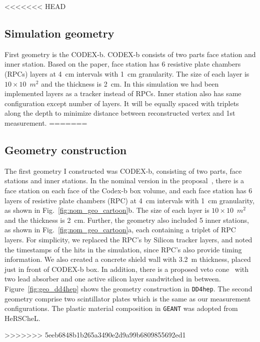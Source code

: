 <<<<<<< HEAD
\subsection{Simulation geometry}
First geometry is the CODEX-b.
CODEX-b consists of two parts face station and inner station.
Based on the paper, face station has 6 resistive plate chambers (RPCs) layers at 4~cm intervals with 1~cm granularity.
The size of each layer is $10 \times 10$~$m^{2}$ and the thickness is 2~cm. 
In this simulation we had been implemented layers as a tracker instead of RPCs.
Inner station also has same configuration except number of layers.
It will be equally spaced with triplets along the depth to minimize distance between reconstructed vertex and 1st measurement. 
=======





\subsection{Geometry construction}
The first geometry I constructed was CODEX-b, consisting of two parts, face stations and inner stations. In the nominal version in the proposal~\cite{Gligorov:2017nwh}, there is a face station on each face of the Codex-b box volume, and each face station has 6 layers of resistive plate chambers (RPC) at 4~cm intervals with 1~cm granularity, as shown in Fig.~\ref{fig:nom_geo_cartoon}b. The size of each layer is $10 \times 10$~$m^{2}$ and the thickness is 2~cm. Further, the geometry also included 5 inner stations, as shown in Fig.~\ref{fig:nom_geo_cartoon}a, each containing a triplet of RPC layers. For simplicity, we replaced the RPC's by Silicon tracker layers, and noted the timestamps of the hits in the simulation, since RPC's also provide timing information. We also created a concrete shield wall with 3.2~m thickness, placed just in front of CODEX-b box. In addition, there is a proposed veto cone~\cite{Gligorov:2017nwh} with two lead absorber and one active silicon layer sandwitched in between. Figure~\ref{fig:geo_dd4hep} shows the geometry construction in {\tt DD4hep}. The second geometry comprise two scintillator plates which is the same as our measurement configurations. The plastic material composition in {\tt GEANT} was adopted from HeRSCheL.

>>>>>>> 5eeb6848b1b265a3490e2d9a99b6809855692ed1

